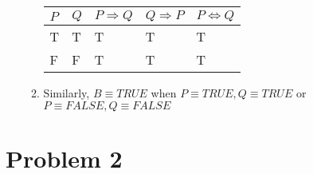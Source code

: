 \documentclass[11pt,letterpaper]{article}
\begin{document}
\begin{enumerate}
\begin{enumerate}
		\begin{tabular}{ l l l l l }
			$P$ & $Q$ & $P \Rightarrow Q$ & $Q \Rightarrow P$ & $P \Leftrightarrow Q$ \\ \hline
			T & T & T & T & T\\
		    F & F & T & T & T\\
		\end{tabular}
		\item[] Similarly, $B \equiv TRUE$ when $P \equiv TRUE, Q \equiv TRUE$ or $P \equiv FALSE, Q \equiv FALSE$
	\end{enumerate}
\end{enumerate}

\newpage

\section*{Problem 2} 
\end{document}
